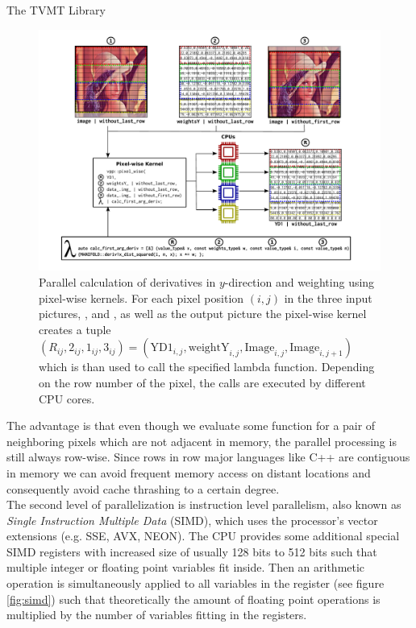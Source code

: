 \begin{chapter}{The TVMT Library}
\begin{figure}[h!]
        \centering
	    \includegraphics[width=1.0\linewidth]{./figures/library/pixelwise_kernel.pdf}
	\caption[Calculation using pixel-wise kernels]{Parallel calculation of derivatives in $y$-direction and weighting using pixel-wise kernels.
	    For each pixel position $(i,j)$ in the three input pictures, ,  and , as well as the output picture
	     the pixel-wise kernel creates a tuple $(R_{ij}, 2_{ij}, 1_{ij}, 3_{ij})=(\text{YD1}_{i,j},\text{weightY}_{i,j},\text{Image}_{i,j},\text{Image}_{i,j+1})$
	    which is than used to call the specified lambda function. Depending on the row number of the pixel, the calls are executed by different CPU cores.
	}
	\label{fig:pixelwise_kernel}
\end{figure}

The advantage is that even though we evaluate some function for a pair of neighboring pixels which are not adjacent in memory, the parallel processing is still
always row-wise. Since rows in row major languages like C++ are contiguous in memory we can avoid frequent memory access on distant locations and consequently avoid cache thrashing to a
certain degree.\\

The second level of parallelization is instruction level parallelism, also known as \textit{Single Instruction Multiple Data} (SIMD), which uses the
processor's vector extensions (e.g. SSE, AVX, NEON).
The CPU provides some additional special SIMD registers with increased size of usually 128 bits to 512 bits such that multiple integer or floating point variables fit inside.
Then an arithmetic operation is simultaneously applied to all variables in the register (see figure \ref{fig:simd}) such that theoretically the amount of floating point operations is multiplied by the number
of variables fitting in the registers. \\


\end{chapter}
